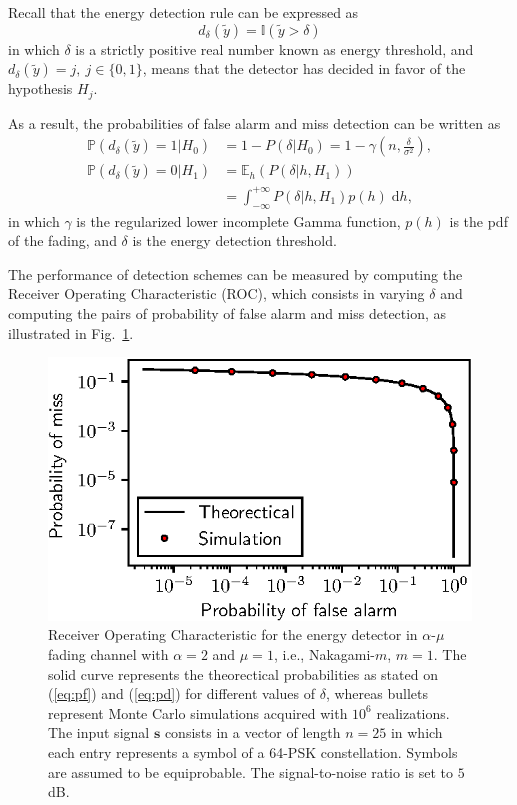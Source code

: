 \documentclass[conference, 10pt]{IEEEtran}
\begin{document}
Recall that the energy detection rule can be expressed as
\begin{equation}
    d_\delta (\tilde{y}) = \mathbb{I}(\tilde{y} > \delta)
\end{equation}
in which $\delta$ is a strictly positive real number known as energy threshold,
and $d_\delta (\tilde{y}) = j,~j \in \{0,1\}$, means that the detector has decided
in favor of the hypothesis $H_j$.

As a result, the probabilities of false alarm and miss detection can
be written as
\begin{align}
    \mathbb{P}\left(d_\delta(\tilde{y}) = 1 | H_0\right) &=
        1 -  P(\delta | H_0) = 1 - \gamma\left(n, \frac{\delta}{\sigma^2}\right),\label{eq:pf} \\
    \mathbb{P}\left(d_\delta(\tilde{y}) = 0 | H_1\right) &= \mathbb{E}_{h}\left(P(\delta| h, H_1)\right)\nonumber\\
    &= \int_{-\infty}^{+\infty} P(\delta | h, H_1)p(h)\;\mathrm{d}h,\label{eq:pd}
\end{align}
in which $\gamma$ is the regularized lower incomplete Gamma function, $p(h)$ is the pdf of the fading,
and $\delta$ is the energy detection threshold.

The performance of detection schemes can be measured by computing the Receiver Operating
Characteristic (ROC), which consists in varying $\delta$ and computing the pairs of
probability of false alarm and miss detection, as illustrated in Fig.~\ref{fig:spectrum-sensing}.

\begin{figure}[!htb]
    \centering
    \includegraphics{figures/spectrum_sensing.eps}
    \caption{Receiver Operating Characteristic for the energy detector in $\alpha$-$\mu$
             fading channel with $\alpha=2$ and $\mu=1$, i.e., Nakagami-$m$, $m = 1$.
             The solid curve represents the theorectical probabilities as stated on
             (\ref{eq:pf}) and (\ref{eq:pd}) for different values of
             $\delta$, whereas bullets represent Monte Carlo simulations acquired with $10^6$ realizations.
             The input signal $\bm{s}$ consists in a vector of length $n=25$ in which each entry represents
             a symbol of a 64-PSK constellation. Symbols are assumed to be equiprobable.
             The signal-to-noise ratio is set to $5$ dB.}
    \label{fig:spectrum-sensing}
\end{figure}
\end{document}
